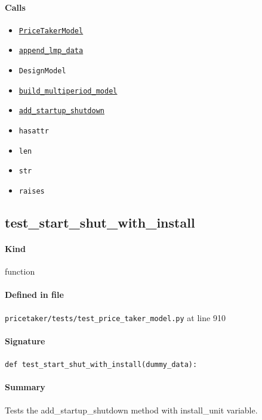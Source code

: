 \documentclass[11pt]{report}
\begin{document}
\paragraph{Calls}
\begin{itemize}[leftmargin=*]
  \item \hyperref[def:pricetaker-price_taker_model.py:PriceTakerModel:L161]{\texttt{PriceTakerModel}}
  \item \hyperref[def:pricetaker-price_taker_model.py:PriceTakerModel.append_lmp_data:L221]{\texttt{append\_lmp\_data}}
  \item \texttt{DesignModel}
  \item \hyperref[def:pricetaker-price_taker_model.py:PriceTakerModel.build_multiperiod_model:L291]{\texttt{build\_multiperiod\_model}}
  \item \hyperref[def:pricetaker-price_taker_model.py:PriceTakerModel.add_startup_shutdown:L813]{\texttt{add\_startup\_shutdown}}
  \item \texttt{hasattr}
  \item \texttt{len}
  \item \texttt{str}
  \item \texttt{raises}
\end{itemize}
\subsection{test\_start\_shut\_with\_install}
\label{def:pricetaker-tests-test_price_taker_model.py:test_start_shut_with_install:L910}
\paragraph{Kind} function
\paragraph{Defined in file} \texttt{pricetaker/tests/test\_price\_taker\_model.py} at line 910
\paragraph{Signature} \texttt{def test\_start\_shut\_with\_install(dummy\_data):}
\paragraph{Summary} Tests the add\_startup\_shutdown method with install\_unit variable.
\end{document}
